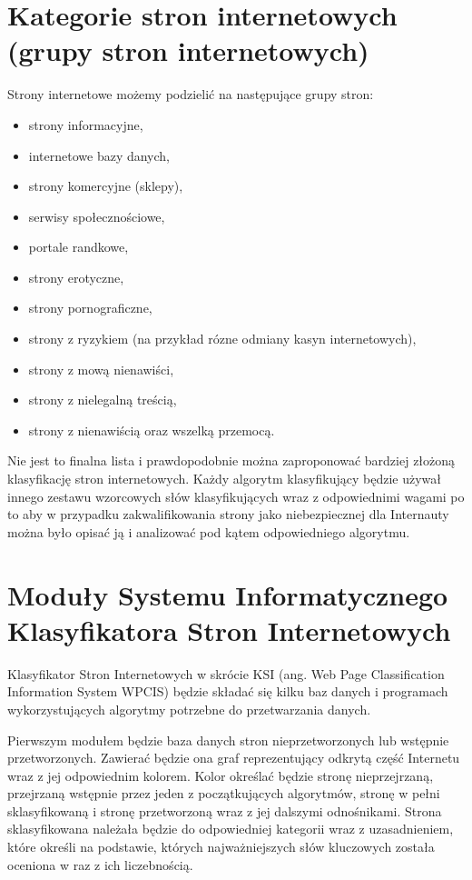 \documentclass[10pt,twoside,a4paper]{article}
\begin{document}
\section{Kategorie stron internetowych (grupy stron internetowych)}
Strony internetowe możemy podzielić na następujące grupy stron:
\begin{itemize}
\item strony informacyjne,
\item	internetowe bazy danych,
\item	strony komercyjne (sklepy),
\item	serwisy społecznościowe,
\item	portale randkowe,
\item	strony erotyczne,
\item	strony pornograficzne,
\item	strony z ryzykiem (na przykład rózne odmiany kasyn internetowych),
\item	strony z mową nienawiści,
\item	strony z nielegalną treścią,
\item	strony z nienawiścią oraz wszelką przemocą.
\end{itemize}

Nie jest to finalna lista i prawdopodobnie można zaproponować bardziej złożoną klasyfikację stron internetowych. Każdy algorytm klasyfikujący będzie używał innego zestawu wzorcowych słów klasyfikujących wraz z odpowiednimi wagami po to aby w przypadku zakwalifikowania strony jako niebezpiecznej dla Internauty można było opisać ją i analizować pod kątem odpowiedniego algorytmu.

\section{Moduły Systemu Informatycznego Klasyfikatora Stron Internetowych}

Klasyfikator Stron Internetowych w skrócie KSI (ang. Web Page Classification Information System WPCIS) będzie składać się kilku baz danych i programach wykorzystujących algorytmy potrzebne do przetwarzania danych.

Pierwszym modułem będzie baza danych stron nieprzetworzonych lub wstępnie przetworzonych. Zawierać będzie ona graf reprezentujący odkrytą część Internetu wraz z jej odpowiednim kolorem. Kolor określać będzie stronę nieprzejrzaną, przejrzaną wstępnie przez jeden z początkujących algorytmów, stronę w pełni sklasyfikowaną i stronę przetworzoną wraz z jej dalszymi odnośnikami. Strona sklasyfikowana należała będzie do odpowiedniej kategorii wraz z uzasadnieniem, które określi na podstawie, których najważniejszych słów kluczowych została oceniona w raz z ich liczebnością.
\end{document}
